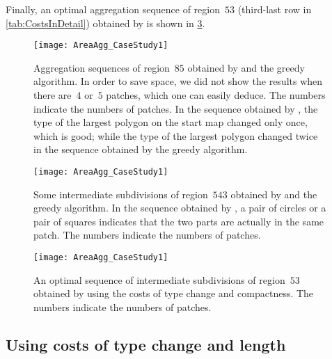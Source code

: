 \documentclass[acmsmall,natbib=false]{acmart}
\begin{document}
Finally, an optimal aggregation sequence of region~$53$
(third-last row in \tab\ref{tab:CostsInDetail})
obtained by \AstarTwo
is shown in \fig\ref{fig:AreaAgg_CaseStudy1_Rg53}.

\begin{figure}[tb]
\centering
\texttt{[image: AreaAgg\_CaseStudy1]}
\caption{Aggregation sequences of region~$85$ 
	obtained by \Astar and the greedy algorithm.
	In order to save space, we did not show the results 
	when there are~$4$ or~$5$ patches, 
	which one can easily deduce.
	The numbers indicate the numbers of patches.
    In the sequence obtained by \Astar, 
    the type of the largest polygon on the start map 
    changed only once, which is good; 
    while the type of the largest polygon changed twice 
    in the sequence obtained by the greedy algorithm.}
\label{fig:AreaAgg_CaseStudy1_Rg85}
\end{figure}

\begin{figure}[tb]
\centering
\texttt{[image: AreaAgg\_CaseStudy1]}
\caption{Some intermediate subdivisions of region~$543$ 
	obtained by \Astar and the greedy algorithm.
	In the sequence obtained by \Astar, 
	a pair of circles or a pair of squares indicates that
	the two parts are actually in the same patch.
	The numbers indicate the numbers of patches.
}
\label{fig:AreaAgg_CaseStudy1_Rg543}
\end{figure}


\begin{figure}[tb]
\centering
\texttt{[image: AreaAgg\_CaseStudy1]}
\caption{An optimal sequence of intermediate subdivisions 
	of region~$53$ obtained by \Astar 
	using the costs of type change and compactness.		 
	The numbers indicate the numbers of patches.		
}
\label{fig:AreaAgg_CaseStudy1_Rg53}
\end{figure}




\clearpage

\subsection{Using costs of type change and length}
\label{sec:AreaAgg_CaseStudy2}
\end{document}
